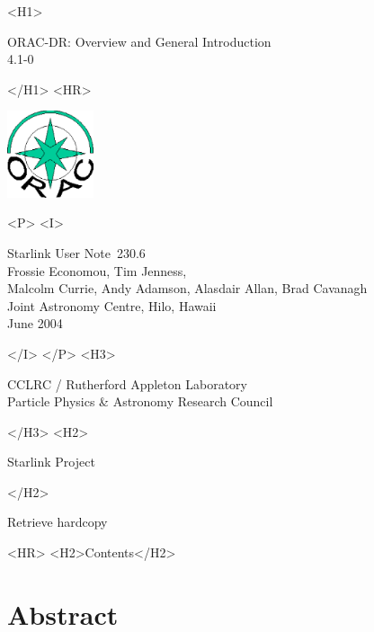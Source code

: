 \documentclass[twoside,11pt]{article}
\newcommand{\stardoccategory}  {Starlink User Note}
\newcommand{\stardocsource}    {sun\stardocnumber}
\newcommand{\stardocnumber}    {230.6}
\newcommand{\stardocauthors}   {Frossie Economou, Tim Jenness,\\
Malcolm Currie, Andy Adamson, Alasdair Allan, Brad Cavanagh\\
Joint Astronomy Centre, Hilo, Hawaii}
\newcommand{\stardocdate}      {June 2004}
\newcommand{\stardoctitle}     {ORAC-DR: Overview and General Introduction}
\newcommand{\stardocversion}   {4.1-0}
\newcommand{\stardocmanual}    {}
\newcommand{\htmladdnormallink}[2]{#1}
\newcommand{\htmladdimg}[1]{}
\newcommand{\htmlref}[2]{#1}
\newcommand{\htmladdtonavigation}[1]{}
\newcommand{\xlabel}[1]{}
\renewcommand{\_}{\texttt{\symbol{95}}}
\begin{document}
\begin{htmlonly}
   \xlabel{}
   \begin{rawhtml} <H1> \end{rawhtml}
      \stardoctitle\\
      \stardocversion\\
      \stardocmanual
   \begin{rawhtml} </H1> <HR> \end{rawhtml}

\includegraphics[width=1.0in]{sun230_logo.eps}

   \begin{rawhtml} <P> <I> \end{rawhtml}
   \stardoccategory\ \stardocnumber \\
   \stardocauthors \\
   \stardocdate
   \begin{rawhtml} </I> </P> <H3> \end{rawhtml}
      \htmladdnormallink{CCLRC / Rutherford Appleton Laboratory}
                        {http://www.cclrc.ac.uk} \\
      \htmladdnormallink{Particle Physics \& Astronomy Research Council}
                        {http://www.pparc.ac.uk} \\
   \begin{rawhtml} </H3> <H2> \end{rawhtml}
      \htmladdnormallink{Starlink Project}{http://www.starlink.rl.ac.uk/}
   \begin{rawhtml} </H2> \end{rawhtml}
   \htmladdnormallink{\htmladdimg{source.gif} Retrieve hardcopy}
      {http://www.starlink.rl.ac.uk/cgi-bin/hcserver?\stardocsource}\\

  \label{stardoccontents}
  \begin{rawhtml}
    <HR>
    <H2>Contents</H2>
  \end{rawhtml}
  \htmladdtonavigation{\htmlref{\htmladdimg{contents_motif.gif}}
        {stardoccontents}}

  \section{\xlabel{abstract}Abstract}
\end{htmlonly}
\end{document}
